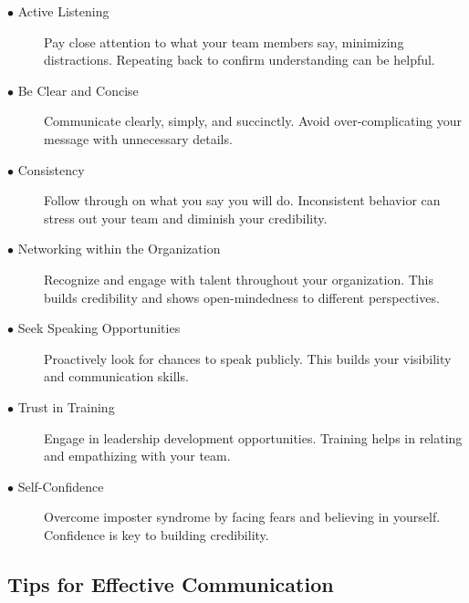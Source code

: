 \documentclass[runningheads]{llncs}
\begin{document}
\begin{description}

 \item [$\bullet$ Active Listening] Pay close attention to what your team members say, minimizing distractions. Repeating back to confirm understanding can be helpful.\\
 \item [$\bullet$ Be Clear and Concise] Communicate clearly, simply, and succinctly. Avoid over-complicating your message with unnecessary details.\\
 \item [$\bullet$ Consistency] Follow through on what you say you will do. Inconsistent behavior can stress out your team and diminish your credibility.\\
 \item [$\bullet$ Networking within the Organization] Recognize and engage with talent throughout your organization. This builds credibility and shows open-mindedness to different perspectives.\\
 \item [$\bullet$ Seek Speaking Opportunities] Proactively look for chances to speak publicly. This builds your visibility and communication skills.\\
 \item [$\bullet$ Trust in Training] Engage in leadership development opportunities. Training helps in relating and empathizing with your team.\\
 \item [$\bullet$ Self-Confidence] Overcome imposter syndrome by facing fears and believing in yourself. Confidence is key to building credibility.\\

\end{description}

\subsection{Tips for Effective Communication}
\end{document}
